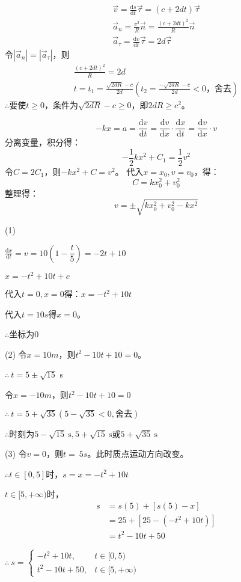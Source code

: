 \documentclass[b5paper,opensource]{./template/qyxf-book}
\newcommand{\di}[1]{\mathrm{d}#1}
\newcommand{\dy}[2]{\frac{\di{#1}}{\di{#2}}}
\begin{document}

\solve
\begin{gather*}
	\vec{v}=\dy{s}{t}\vec{\tau}=(c+2dt)\vec{\tau}\\  
	\vec{a}_n=\frac{v^2}{R}\vec{n}=\frac{(c+2dt)^2}{R}\vec{n}\\
	\vec{a}_\tau=\dy{v}{t}\vec{\tau}=2d\vec{\tau}
\end{gather*}
令$|\vec{a}_n|=|\vec{a}_\tau|$，则
\begin{gather*}
	\frac{(c+2dt)^2}{R}=2d\\
	t=t_1=\frac{\sqrt{2dR}-c}{2d}\left(t_2=\frac{-\sqrt{2dR}-c}{2d}<0\text{，舍去}\right)
\end{gather*}
$\therefore$要使$t\geqslant0$，条件为$\sqrt{2dR}-c\geqslant0$，即$2dR\geqslant c^2$。


\solve
\[
	-kx=a=\dy{v}{t}=\dy{v}{x}\cdot \dy{x}{t}=\dy{v}{x}\cdot v
\]
分离变量，积分得：
\[
	-\dfrac{1}{2}kx^2+C_1=\dfrac{1}{2}v^2
\]
令$C=2C_1$，则$-kx^2+C=v^2$。
代入$x=x_0,v=v_0$，得：
\[
	C=kx_0^2+v_0^2
\]
整理得：
\[
	v=\pm\sqrt{kx_0^2+v_0^2-kx^2}
\]


\solve

(1)

$\dy{x}{t}=v=10\left(1-\dfrac{t}{5}\right)=-2t+10$

$x=-t^2+10t+c$

代入$t=0,x=0$得：$x=-t^2+10t$

代入$t=10s$得$x=0$。

$\therefore$坐标为$0$

(2)
令$x=10m$，则$t^2-10t+10=0$。

$\therefore\ t=5\pm\sqrt{15}$ s

令$x=-10m$，则$t^2-10t+10=0$

$\therefore\ t=5+\sqrt{35}(5-\sqrt{35}<0,\text{舍去})$

$\therefore$时刻为$5-\sqrt{15}\ \textrm{s},5+\sqrt{15}\ \textrm{s}\text{或}5+\sqrt{35}\ \textrm{s}$

(3)
令$v=0$，则$t=\ 5s$。此时质点运动方向改变。

$\therefore t\in[0,5]$时，$s=x=-t^2+10t$

$t\in[5,+\infty)$时，
\begin{align*}
	s&=s(5)+[s(5)-x]\\
	&=25+[25-(-t^2+10t)]\\
	&=t^2-10t+50
\end{align*}

$\therefore\ s=
\begin{cases}
-t^2+10t,&t\in[0,5)\\
t^2-10t+50,&t\in[5,+\infty)
\end{cases}$
\end{document}
